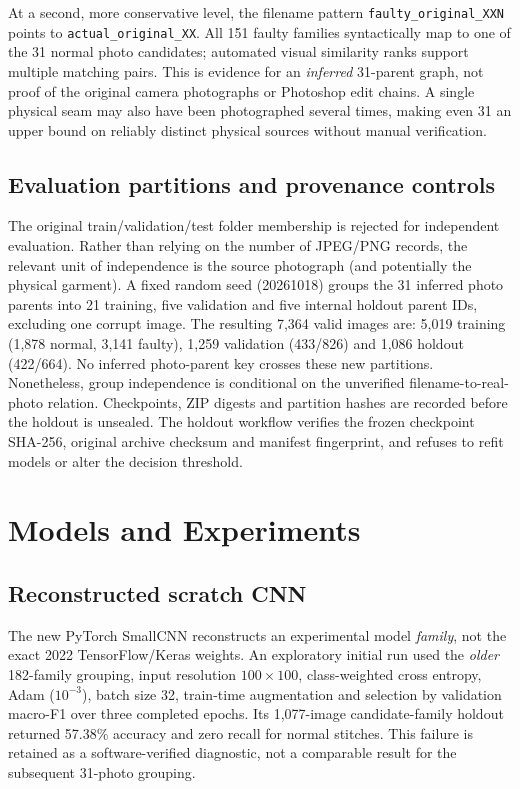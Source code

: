 \documentclass[conference,a4paper]{IEEEtran}
\begin{document}
At a second, more conservative level, the filename pattern \texttt{faulty\_original\_XXN} points to \texttt{actual\_original\_XX}. All 151 faulty families syntactically map to one of the 31 normal photo candidates; automated visual similarity ranks support multiple matching pairs. This is evidence for an \emph{inferred} 31-parent graph, not proof of the original camera photographs or Photoshop edit chains. A single physical seam may also have been photographed several times, making even 31 an upper bound on reliably distinct physical sources without manual verification.

\subsection{Evaluation partitions and provenance controls}
The original train/validation/test folder membership is rejected for independent evaluation. Rather than relying on the number of JPEG/PNG records, the relevant unit of independence is the source photograph (and potentially the physical garment). A fixed random seed (20261018) groups the 31 inferred photo parents into 21 training, five validation and five internal holdout parent IDs, excluding one corrupt image. The resulting 7,364 valid images are: 5,019 training (1,878 normal, 3,141 faulty), 1,259 validation (433/826) and 1,086 holdout (422/664). No inferred photo-parent key crosses these new partitions. Nonetheless, group independence is conditional on the unverified filename-to-real-photo relation. Checkpoints, ZIP digests and partition hashes are recorded before the holdout is unsealed. The holdout workflow verifies the frozen checkpoint SHA-256, original archive checksum and manifest fingerprint, and refuses to refit models or alter the decision threshold.

\section{Models and Experiments}
\subsection{Reconstructed scratch CNN}
The new PyTorch SmallCNN reconstructs an experimental model \emph{family}, not the exact 2022 TensorFlow/Keras weights. An exploratory initial run used the \emph{older} 182-family grouping, input resolution $100\times100$, class-weighted cross entropy, Adam ($10^{-3}$), batch size 32, train-time augmentation and selection by validation macro-F1 over three completed epochs. Its 1,077-image candidate-family holdout returned 57.38\% accuracy and zero recall for normal stitches. This failure is retained as a software-verified diagnostic, not a comparable result for the subsequent 31-photo grouping.
\end{document}
